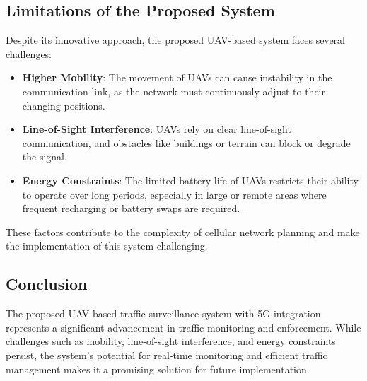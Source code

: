     
    

\vspace{\baselineskip} %

\subsection{Limitations of the Proposed System}
Despite its innovative approach, the proposed UAV-based system faces several challenges:

\begin{itemize}
    \item \textbf{Higher Mobility}: The movement of UAVs can cause instability in the communication link, as the network must continuously adjust to their changing positions.
    \item \textbf{Line-of-Sight Interference}: UAVs rely on clear line-of-sight communication, and obstacles like buildings or terrain can block or degrade the signal.
    \item \textbf{Energy Constraints}: The limited battery life of UAVs restricts their ability to operate over long periods, especially in large or remote areas where frequent recharging or battery swaps are required.
\end{itemize}

These factors contribute to the complexity of cellular network planning and make the implementation of this system challenging.

\vspace{\baselineskip} %

\subsection{Conclusion}
The proposed UAV-based traffic surveillance system with 5G integration represents a significant advancement in traffic monitoring and enforcement. While challenges such as mobility, line-of-sight interference, and energy constraints persist, the system's potential for real-time monitoring and efficient traffic management makes it a promising solution for future implementation.
    

